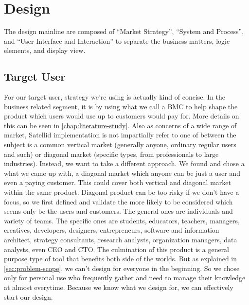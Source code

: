 \section{Design}
\label{sec:design}

The design mainline are composed of ``Market Strategy'', ``System and Process'', and ``User Interface and Interaction'' to separate the business matters, logic elements, and display view.

\subsection{Target User}

For our target user, strategy we're using is actually kind of concise. In the business related segment, it is by using what we call a \ac{BMC} to help shape the product which users would use up to customers would pay for.
More details on this can be seen in \autoref{chap:literature-study}.
Also as concerns of a wide range of market, Satellid implementation is not impartially refer to one of between the subject is a common vertical market (generally anyone, ordinary regular users and such) or diagonal market (specific types, from professionals to large industries).
Instead, we want to take a different approach.
We found and chose a what we came up with, a diagonal market which anyone can be just a user and even a paying customer.
This could cover both vertical and diagonal market within the same product.
Diagonal product can be too risky if we don't have a focus, so we first defined and validate the more likely to be considered which seems only be the users and customers.
The general ones are individuals and variety of teams.
The specific ones are students, educators, teachers, managers, creatives, developers, designers, entrepreneurs, software and information architect, strategy consultants, research analysts, organization managers, data analysts, even \ac{CEO} and \ac{CTO}.
The culmination of this product is a general purpose type of tool that benefits both side of the worlds.
But as explained in \autoref{sec:problem-scope}, we can't design for everyone in the beginning.
So we chose only for personal use who frequently gather and need to manage their knowledge at almost everytime.
Because we know what we design for, we can effectively start our design.


